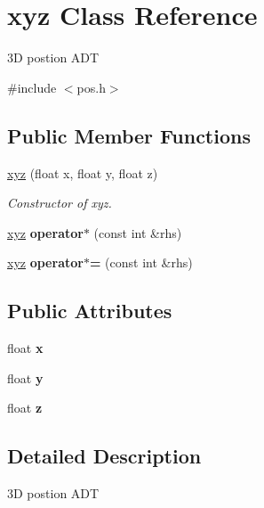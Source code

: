 \hypertarget{classxyz}{}\section{xyz Class Reference}
\label{classxyz}


3D postion A\+DT  




{\ttfamily \#include $<$pos.\+h$>$}

\subsection*{Public Member Functions}
\begin{DoxyCompactItemize}
\item 
\hyperlink{classxyz_a1ae38c73f1c13a1987bb93ee6329ddf4}{xyz} (float x, float y, float z)
\begin{DoxyCompactList}\small\item\em Constructor of xyz. \end{DoxyCompactList}\item 
\mbox{\label{classxyz_a26cbbf9ea62237c4f3604fd8b62ed3f7}} 
\hyperlink{classxyz}{xyz} {\bfseries operator$\ast$} (const int \&rhs)
\item 
\mbox{\label{classxyz_a54a30a5e3d0d8c1abcb8525aac160d44}} 
\hyperlink{classxyz}{xyz} {\bfseries operator$\ast$=} (const int \&rhs)
\end{DoxyCompactItemize}
\subsection*{Public Attributes}
\begin{DoxyCompactItemize}
\item 
\mbox{\label{classxyz_a4970d1cf1115643f1290f01d4d54fc6d}} 
float {\bfseries x}
\item 
\mbox{\label{classxyz_aaccbc4e1149916be1a53d17b3bf49aed}} 
float {\bfseries y}
\item 
\mbox{\label{classxyz_a4054d759b914e0b7bb083e1932b31257}} 
float {\bfseries z}
\end{DoxyCompactItemize}


\subsection{Detailed Description}
3D postion A\+DT 

